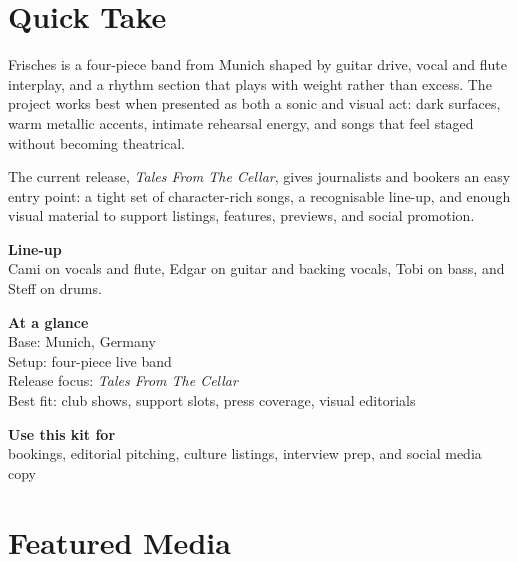 \documentclass[11pt,a4paper]{article}
\begin{document}
\section*{Quick Take}

\begin{minipage}[t]{0.58\textwidth}
\vspace{0pt}
Frisches is a four-piece band from Munich shaped by guitar drive, vocal and flute interplay, and a rhythm section that plays with weight rather than excess. The project works best when presented as both a sonic and visual act: dark surfaces, warm metallic accents, intimate rehearsal energy, and songs that feel staged without becoming theatrical.

The current release, \textit{Tales From The Cellar}, gives journalists and bookers an easy entry point: a tight set of character-rich songs, a recognisable line-up, and enough visual material to support listings, features, previews, and social promotion.

\vspace{0.75em}

\begin{frcard}
  \textbf{Line-up}\\[0.25em]
  Cami on vocals and flute, Edgar on guitar and backing vocals, Tobi on bass, and Steff on drums.
\end{frcard}
\end{minipage}\hfill
\begin{minipage}[t]{0.38\textwidth}
\vspace{0pt}
\begin{frcard}
  \textbf{At a glance}\\[0.3em]
  Base: Munich, Germany\\
  Setup: four-piece live band\\
  Release focus: \textit{Tales From The Cellar}\\
  Best fit: club shows, support slots, press coverage, visual editorials
\end{frcard}

\vspace{0.7em}

\begin{frcard}
  \textbf{Use this kit for}\\[0.3em]
  bookings, editorial pitching, culture listings, interview prep, and social media copy
\end{frcard}
\end{minipage}

\section*{Featured Media}
\end{document}
